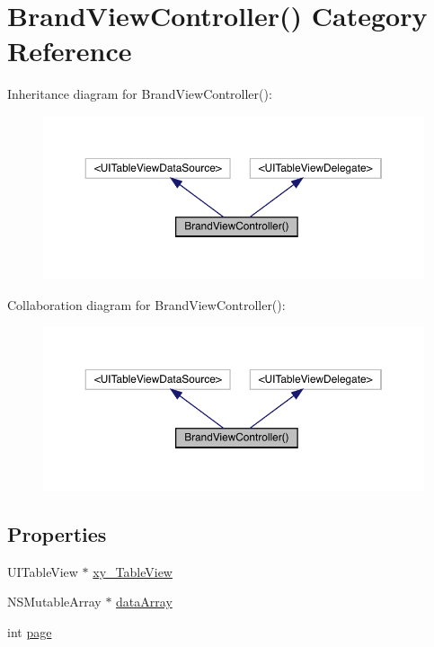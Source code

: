 \hypertarget{category_brand_view_controller_07_08}{}\section{Brand\+View\+Controller() Category Reference}
\label{category_brand_view_controller_07_08}


Inheritance diagram for Brand\+View\+Controller()\+:\nopagebreak
\begin{figure}[H]
\begin{center}
\leavevmode
\includegraphics[width=350pt]{category_brand_view_controller_07_08__inherit__graph}
\end{center}
\end{figure}


Collaboration diagram for Brand\+View\+Controller()\+:\nopagebreak
\begin{figure}[H]
\begin{center}
\leavevmode
\includegraphics[width=350pt]{category_brand_view_controller_07_08__coll__graph}
\end{center}
\end{figure}
\subsection*{Properties}
\begin{DoxyCompactItemize}
\item 
U\+I\+Table\+View $\ast$ \mbox{\hyperlink{category_brand_view_controller_07_08_abeb7b6d1cb030d873f1264da2cb7e280}{xy\+\_\+\+Table\+View}}
\item 
N\+S\+Mutable\+Array $\ast$ \mbox{\hyperlink{category_brand_view_controller_07_08_a5d7b24426965909038323527e4c04bb1}{data\+Array}}
\item 
int \mbox{\hyperlink{category_brand_view_controller_07_08_af5c8e20cbe8c940d5f1d548cc677a376}{page}}
\end{DoxyCompactItemize}


